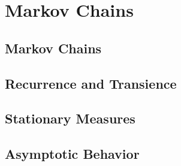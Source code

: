 \chapter{Markov Chains}

\section{Markov Chains}

\begin{definition}
    
\end{definition}

\begin{theorem}
    
\end{theorem}

\begin{corollary}
    
\end{corollary}

\begin{theorem}
    
\end{theorem}

\section{Recurrence and Transience}

\section{Stationary Measures}

\section{Asymptotic Behavior}